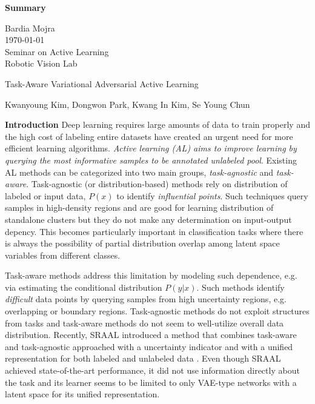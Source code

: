 \documentclass[12pt]{article}
\begin{document}
\begin{center}
\textbf{Summary}\\
\end{center}

\noindent
Bardia Mojra\\
\today\\
Seminar on Active Learning\\
Robotic Vision Lab\\
\begin{center}
{\large Task-Aware Variational Adversarial Active Learning\\}
\end{center}
\begin{center}
  {\small Kwanyoung Kim, Dongwon Park, Kwang In Kim, Se Young Chun}\\
\end{center}

\noindent
\textbf{Introduction}
Deep learning requires large amounts of data to train properly and the high
cost of
labeling entire datasets have created an urgent need for more efficient
learning algorithms. \textit{Active learning (AL) aims to improve learning by
querying the most informative samples to be annotated unlabeled pool}.
Existing AL methods can be categorized into two main groups,
\textit{task-agnostic} and \textit{task-aware}.
Task-agnostic (or distribution-based) methods rely on distribution of labeled
or input data, \(P(x)\) to identify \textit{influential points}. Such techniques
query samples in high-density regions and are good for learning distribution of
standalone clusters but they do not make any determination on input-output
depency. This becomes particularly important in classification
tasks where there is always the possibility of partial distribution overlap
among latent space variables from different classes.

Task-aware methods address this limitation by modeling such dependence,
e.g. via estimating the conditional distribution \(P(y|x)\). Such methods
identify \textit{difficult} data points by querying samples from high uncertainty
regions, e.g. overlapping or boundary regions.
Task-agnostic methods do not exploit structures from tasks and task-aware
methods do not seem to well-utilize overall data distribution. Recently,
SRAAL introduced a method that combines task-aware and
task-agnostic approached with a uncertainty indicator and with a unified
representation for both labeled and unlabeled data \cite{SRAAL}.
Even though SRAAL achieved state-of-the-art performance, it did not use
information directly about the task \cite{LearningLoss} and its learner
seems to be limited to only VAE-type networks with a latent space for its
unified representation.
\end{document}
